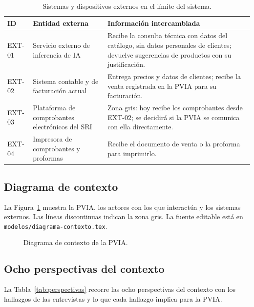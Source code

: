 \begin{table}[H]
\centering
\caption{Sistemas y dispositivos externos en el límite del sistema.}
\label{tab:externas}
\small
\begin{tabularx}{\textwidth}{@{}L{1.4cm}L{3.4cm}X@{}}
\toprule
\textbf{ID} & \textbf{Entidad externa} & \textbf{Información intercambiada} \\
\midrule
EXT-01 & Servicio externo de inferencia de IA & Recibe la consulta técnica con datos del catálogo, sin datos personales de clientes; devuelve sugerencias de productos con su justificación. \\
EXT-02 & Sistema contable y de facturación actual & Entrega precios y datos de clientes; recibe la venta registrada en la PVIA para su facturación. \\
EXT-03 & Plataforma de comprobantes electrónicos del SRI & Zona gris: hoy recibe los comprobantes desde EXT-02; se decidirá si la PVIA se comunica con ella directamente. \\
EXT-04 & Impresora de comprobantes y proformas & Recibe el documento de venta o la proforma para imprimirlo. \\
\bottomrule
\end{tabularx}
\end{table}

\subsection{Diagrama de contexto}

La Figura~\ref{fig:contexto} muestra la PVIA, los actores con los que interactúa y los sistemas externos. Las líneas discontinuas indican la zona gris. La fuente editable está en \texttt{modelos/diagrama-contexto.tex}.

\begin{figure}[H]
\centering

\caption{Diagrama de contexto de la PVIA.}
\label{fig:contexto}
\end{figure}

\subsection{Ocho perspectivas del contexto}

La Tabla~\ref{tab:perspectivas} recorre las ocho perspectivas del contexto con los hallazgos de las entrevistas y lo que cada hallazgo implica para la PVIA.

